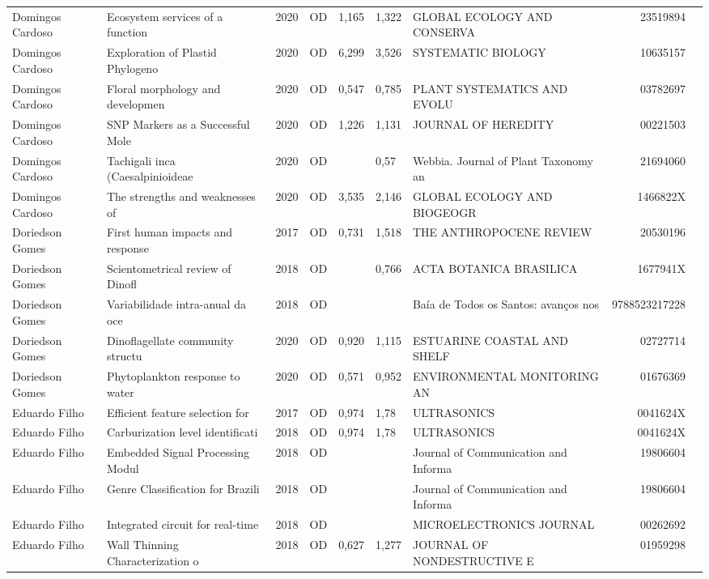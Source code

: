 \documentclass[12pt,brazil]{article}\usepackage[]{graphicx}\usepackage[]{xcolor}
\begin{document}
\begin{longtable}{lllrrllrr}
Domingos Cardoso & Ecosystem services of a function & 2020 & OD & 1,165 & 1,322 & GLOBAL ECOLOGY AND CONSERVA & 23519894 \\
Domingos Cardoso & Exploration of Plastid Phylogeno & 2020 & OD & 6,299 & 3,526 & SYSTEMATIC BIOLOGY & 10635157 \\
Domingos Cardoso & Floral morphology and developmen & 2020 & OD & 0,547 & 0,785 & PLANT SYSTEMATICS AND EVOLU & 03782697 \\
Domingos Cardoso & SNP Markers as a Successful Mole & 2020 & OD & 1,226 & 1,131 & JOURNAL OF HEREDITY & 00221503 \\
Domingos Cardoso & Tachigali inca (Caesalpinioideae & 2020 & OD &  & 0,57 & Webbia. Journal of Plant Taxonomy an & 21694060 \\
Domingos Cardoso & The strengths and weaknesses of  & 2020 & OD & 3,535 & 2,146 & GLOBAL ECOLOGY AND BIOGEOGR & 1466822X \\
Doriedson Gomes & First human impacts and response & 2017 & OD & 0,731 & 1,518 & THE ANTHROPOCENE REVIEW & 20530196 \\
Doriedson Gomes & Scientometrical review of Dinofl & 2018 & OD &  & 0,766 & ACTA BOTANICA BRASILICA & 1677941X \\
Doriedson Gomes & Variabilidade intra-anual da oce & 2018 & OD &  &  & Baía de Todos os Santos: avanços nos & 9788523217228 \\
Doriedson Gomes & Dinoflagellate community structu & 2020 & OD & 0,920 & 1,115 & ESTUARINE COASTAL AND SHELF & 02727714 \\
Doriedson Gomes & Phytoplankton response to water  & 2020 & OD & 0,571 & 0,952 & ENVIRONMENTAL MONITORING AN & 01676369 \\
Eduardo Filho & Efficient feature selection for  & 2017 & OD & 0,974 & 1,78 & ULTRASONICS & 0041624X \\
Eduardo Filho & Carburization level identificati & 2018 & OD & 0,974 & 1,78 & ULTRASONICS & 0041624X \\
Eduardo Filho & Embedded Signal Processing Modul & 2018 & OD &  &  & Journal of Communication and Informa & 19806604 \\
Eduardo Filho & Genre Classification for Brazili & 2018 & OD &  &  & Journal of Communication and Informa & 19806604 \\
Eduardo Filho & Integrated circuit for real-time & 2018 & OD &  &  & MICROELECTRONICS JOURNAL & 00262692 \\
Eduardo Filho & Wall Thinning Characterization o & 2018 & OD & 0,627 & 1,277 & JOURNAL OF NONDESTRUCTIVE E & 01959298 \\

\end{longtable}
\end{document}
